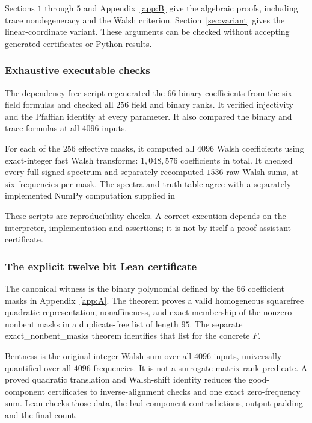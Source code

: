 \documentclass[11pt,a4paper]{article}
\theoremstyle{definition}
\begin{document}
Sections $1$ through $5$ and Appendix~\ref{app:B} give the algebraic proofs, including trace nondegeneracy and the Walsh criterion. Section~\ref{sec:variant} gives the linear-coordinate variant. These arguments can be checked without accepting generated certificates or Python results.


\subsubsection*{Exhaustive executable checks}

The dependency-free script  regenerated the $66$ binary coefficients from the six field formulas and checked all $256$ field and binary ranks. It verified injectivity and the Pfaffian identity at every parameter. It also compared the binary and trace formulas at all $4096$ inputs.


For each of the $256$ effective masks, it computed all $4096$ Walsh coefficients using exact-integer fast Walsh transforms: $1,048,576$ coefficients in total. It checked every full signed spectrum and separately recomputed $1536$ raw Walsh sums, at six frequencies per mask. The spectra and truth table agree with a separately implemented NumPy computation supplied in 


These scripts are reproducibility checks. A correct execution depends on the interpreter, implementation and assertions; it is not by itself a proof-assistant certificate.


\subsubsection*{The explicit twelve bit Lean certificate}

The canonical witness is the binary polynomial defined by the $66$ coefficient masks in Appendix~\ref{app:A}. The theorem  proves a valid homogeneous squarefree quadratic representation, nonaffineness, and exact membership of the nonzero nonbent masks in a duplicate-free list of length $95$. The separate exact\_nonbent\_masks theorem identifies that list for the concrete $F$.


Bentness is the original integer Walsh sum over all $4096$ inputs, universally quantified over all $4096$ frequencies. It is not a surrogate matrix-rank predicate. A proved quadratic translation and Walsh-shift identity reduces the good-component certificates to inverse-alignment checks and one exact zero-frequency sum. Lean checks those data, the bad-component contradictions, output padding and the final count.
\end{document}
